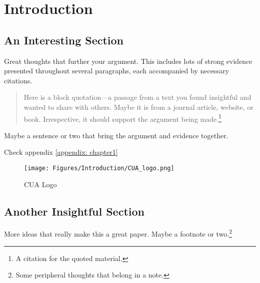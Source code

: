 \chapter{Introduction}
\label{chapter:introduction}

\section{An Interesting Section}
\label{section:interesting_section}

Great thoughts that further your argument. This includes lots of strong evidence presented throughout several paragraphs, each accompanied by necessary citations.
\begin{quotation}
    \noindent Here is a block quotation---a passage from a text you found insightful and wanted to share with others. Maybe it is from a journal article, website, or book. Irrespective, it should support the argument being made.\footnote{A citation for the quoted material.}
\end{quotation}

Maybe a sentence or two that bring the argument and evidence together.\citep{dos_santos_2020}

Check appendix \ref{appendix: chapter1}

\begin{figure} [ht]
\centering
         \texttt{[image: Figures/Introduction/CUA\_logo.png]}
         \caption{CUA Logo}
         \label{CUA-logo-1}
\end{figure}


\section{Another Insightful Section}
\label{section:another_interesting_section}

More ideas that really make this a great paper. Maybe a footnote or two.\footnote{Some peripheral thoughts that belong in a note.}
